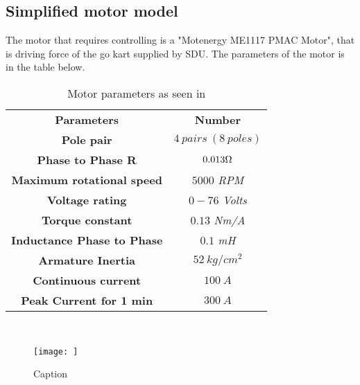 \subsection{Simplified motor model}
The motor that requires controlling is a "Motenergy ME1117 PMAC Motor", that is driving force of the go kart supplied by SDU. The parameters of the motor is in the table below.

\begin{table} [H]
\centering
\begin{tabular}{|c|c|} \cline{1-2}
\textbf{Parameters} & \textbf{Number} \\ \cline{1-2}
\textbf{Pole pair} & $4\ pairs\ (8\ poles)$ \\ \cline{1-2}
\textbf{Phase to Phase R} & $0.013\ohm$ \\ \cline{1-2}
\textbf{Maximum rotational speed} & $5000$ \textit{RPM} \\ \cline{1-2}
\textbf{Voltage rating} & $0-76$ \textit{Volts} \\ \cline{1-2}
\textbf{Torque constant} & $0.13$ \textit{Nm/A} \\ \cline{1-2}
\textbf{Inductance Phase to Phase} & $0.1$ \textit{mH} \\ \cline{1-2}
\textbf{Armature Inertia} & $52\ kg/cm^2$ \\ \cline{1-2}
\textbf{Continuous current} & $100\ A$ \\ \cline{1-2}
\textbf{Peak Current for 1 min} & $300\ A$ \\ \cline{1-2}  
\end{tabular} \\
\caption{Motor parameters as seen in \cite{Motor_Parameters}}
\label{Motor_parameters_list}
\end{table}

\begin{figure}
    \centering
    \texttt{[image: ]}
    \caption{Caption}
    \label{fig:my_label}
\end{figure}{}